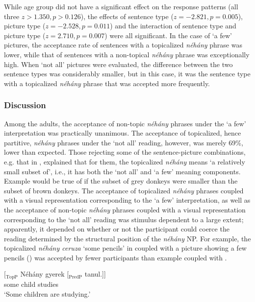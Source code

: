 \documentclass[output=paper]{langscibook}
\begin{document}
While age group did not have a significant effect on the response patterns (all three $z > 1.350, p > 0.126$), the effects of sentence type ($z = -2.821, p = 0.005$), picture type ($z = -2.528, p = 0.011$) and the interaction of sentence type and picture type ($z = 2.710, p = 0.007$) were all significant. In the case of `a few' pictures, the acceptance rate of sentences with a topicalized \textit{néhány} phrase was lower, while that of sentences with a non-topical \textit{néhány} phrase was exceptionally high. When `not all' pictures were evaluated, the difference between the two sentence types was considerably smaller, but in this case, it was the sentence type with a topicalized \textit{néhány} phrase that was accepted more frequently. 

\subsubsection{Discussion}

Among the adults, the acceptance of non-topic \textit{néhány} phrases under the `a few' interpretation was practically unanimous. The acceptance of topicalized, hence partitive, \textit{néhány} phrases under the `not all' reading, however, was merely 69\%, lower than expected. Those rejecting some of the sentence-picture combinations, e.g. that in , explained that for them, the topicalized \textit{néhány} means `a relatively small subset of', i.e., it has both the `not all' and `a few' meaning components.  Example  would be true of  if the subset of grey donkeys were smaller than the subset of brown donkeys. The acceptance of topicalized \textit{néhány} phrases coupled with a visual representation corresponding to the `a few' interpretation, as well as the acceptance of non-topic \textit{néhány} phrases coupled with a visual representation corresponding to the `not all' reading was stimulus dependent to a large extent; apparently, it depended on whether or not the participant could coerce the reading determined by the structural position of the \textit{néhány} NP. For example, the topicalized \textit{néhány ceruza} `some pencils' in  coupled with a picture showing a few pencils () was accepted by fewer participants than example  coupled with  . 

\ea
\gll \label{kis-zet:nehany gyerek tanul}[$_\text{TopP}$ Néhány gyerek [$_\text{PredP}$ tanul.]]\\ 
     {} some child {} studies\\ 
\glt `Some children are studying.'
\z
\end{document}

